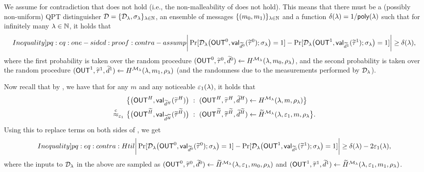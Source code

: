  We assume for contradiction that  does not hold (i.e.,  the non-malleability of  does not hold). This means that there must be  a (possibly non-uniform) QPT distinguisher $\mathcal{D} = \{\mathcal{D}_\lambda, \sigma_\lambda\}_{\lambda \in \mathbb{N}}$, an ensemble of messages $\{(m_0, m_1)\}_{\lambda \in \mathbb{N}}$ and a function $\delta(\lambda) = 1/\mathsf{poly}(\lambda)$ such that for infinitely many $\lambda \in \mathbb{N}$, it holds that
\begin{equation}\label[Inequality]{pq:eq:one-sided:proof:contra-assump}
\bigg|\Pr[\mcal{D}_\secpar\big(\OUT^0, \msf{val}_{\tilde{d}^0}(\tilde{\tau}^0); \sigma_\secpar\big)=1] - \Pr[\mcal{D}_\secpar\big(\OUT^1, \msf{val}_{\tilde{d}^1}(\tilde{\tau}^1); \sigma_\secpar\big)=1] \bigg|\ge  \delta(\secpar),
\end{equation}
where the first probability is taken over the random procedure $(\mathsf{OUT}^0, \widetilde{\tau}^0, \widetilde{d}^0) \gets H^{\mathcal{M}_\lambda}(\lambda,m_0,\rho_\lambda)$, and the second probability is taken over the random procedure $(\mathsf{OUT}^1, \widetilde{\tau}^1, \widetilde{d}^1) \gets H^{\mathcal{M}_\lambda}(\lambda,m_1,\rho_\lambda)$ (and the randomness due to the measurements performed by $\mathcal{D}_\lambda$).

Now recall that by , we have that for any $m$ and any noticeable $\varepsilon_1(\lambda)$, it holds that
\begin{align*}
& 
\big\{\big(\mathsf{OUT}^H, \mathsf{val}_{\widetilde{d}^H}(\widetilde{\tau}^H)\big)~:~(\mathsf{OUT}^{{H}}, \widetilde{\tau}^{{H}}, \widetilde{d}^{{H}}) \gets {H}^{\mathcal{M}_\lambda}(\lambda, m, \rho_\lambda)\big\} \\ 
\stackrel{\text{c}}{\approx}_{\varepsilon_1}~ &
\big\{\big(\mathsf{OUT}^{\widetilde{H}}, \mathsf{val}_{\widetilde{d}^{\widetilde{H}}}(\widetilde{\tau}^{\widetilde{H}})\big)~:~(\mathsf{OUT}^{\widetilde{H}}, \widetilde{\tau}^{\widetilde{H}}, \widetilde{d}^{\widetilde{H}}) \gets \widetilde{H}^{\mathcal{M}_\lambda}(\lambda, \varepsilon_1, m, \rho_\lambda\big\}.
\end{align*} 
Using this to replace terms on both sides of , we get  
\begin{equation}\label[Inequality]{pq:eq:contra:Htil}
    \bigg|\Pr[\mcal{D}_\secpar\big(\OUT^0, \msf{val}_{\tilde{d}^0}(\tilde{\tau}^0); \sigma_\secpar\big)=1] - \Pr[\mcal{D}_\secpar\big(\OUT^1, \msf{val}_{\tilde{d}^1}(\tilde{\tau}^1); \sigma_\secpar\big)=1] \bigg|\ge \delta(\secpar) - 2\epsilon_1(\secpar),
\end{equation}
where the inputs to $\mathcal{D}_\lambda$ in the above are sampled as $(\mathsf{OUT}^0, \widetilde{\tau}^0, \widetilde{d}^0) \gets \widetilde{H}^{\mathcal{M}_\lambda}(\lambda, \varepsilon_1, m_0,\rho_\lambda)$ and $(\mathsf{OUT}^1, \widetilde{\tau}^1, \widetilde{d}^1) \gets \widetilde{H}^{\mathcal{M}_\lambda}(\lambda, \varepsilon_1, m_1,\rho_\lambda)$. 

